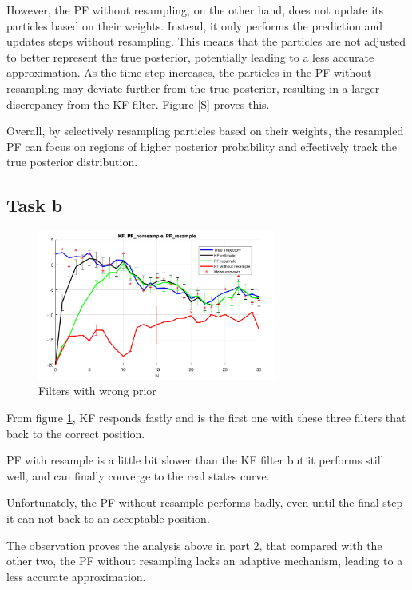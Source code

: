 However, the PF without resampling, on the other hand, does not update its particles based on their weights. Instead, it only performs the prediction and updates steps without resampling. This means that the particles are not adjusted to better represent the true posterior, potentially leading to a less accurate approximation. As the time step increases, the particles in the PF without resampling may deviate further from the true posterior, resulting in a larger discrepancy from the KF filter. Figure \ref{S} proves this. 

Overall, by selectively resampling particles based on their weights, the resampled PF can focus on regions of higher posterior probability and effectively track the true posterior distribution. 

\subsection{Task b}

\begin{figure}[H]
 \centering
 \includegraphics[width=0.7\textwidth]{images/wrongprior.png}
 \caption{Filters with wrong prior}
 \label{wrong}
\end{figure}

From figure \ref{wrong}, KF responds fastly and is the first one with these three filters that back to the correct position.

PF with resample is a little bit slower than the KF filter but it performs still well, and can finally converge to the real states curve.

Unfortunately, the PF without resample performs badly, even until the final step it can not back to an acceptable position.

The observation proves the analysis above in part 2, that compared with the other two,  the PF without resampling lacks an adaptive mechanism, leading to a less accurate approximation.

